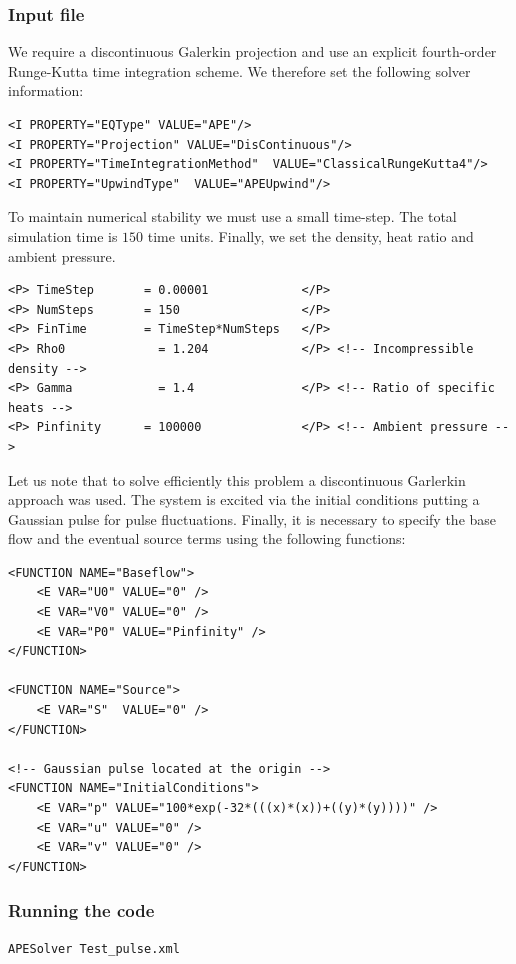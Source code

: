 \subsubsection{Input file}
We require a discontinuous Galerkin projection and use an explicit
fourth-order Runge-Kutta time integration scheme. We therefore set the following
solver information:
\begin{lstlisting}[style=XmlStyle]
<I PROPERTY="EQType" VALUE="APE"/> 
<I PROPERTY="Projection" VALUE="DisContinuous"/>
<I PROPERTY="TimeIntegrationMethod"  VALUE="ClassicalRungeKutta4"/>
<I PROPERTY="UpwindType"  VALUE="APEUpwind"/>
\end{lstlisting}

To maintain numerical stability we must use a small time-step. The total
simulation time is $150$ time units. Finally, we set the density, heat ratio and
ambient pressure.
\begin{lstlisting}[style=XMLStyle]
<P> TimeStep       = 0.00001             </P>
<P> NumSteps       = 150                 </P>
<P> FinTime        = TimeStep*NumSteps   </P>
<P> Rho0             = 1.204             </P> <!-- Incompressible density -->
<P> Gamma            = 1.4               </P> <!-- Ratio of specific heats -->
<P> Pinfinity      = 100000              </P> <!-- Ambient pressure -->
\end{lstlisting}

Let us note that to solve efficiently this problem a discontinuous Garlerkin
approach was used. The
system is excited via the initial conditions putting a Gaussian pulse for pulse
fluctuations.  Finally, it is necessary to specify the base flow and the
eventual source terms using the following functions:

\begin{lstlisting}[style=XmlStyle]
<FUNCTION NAME="Baseflow"> 
    <E VAR="U0" VALUE="0" />
    <E VAR="V0" VALUE="0" />
    <E VAR="P0" VALUE="Pinfinity" />
</FUNCTION>

<FUNCTION NAME="Source"> 
    <E VAR="S"  VALUE="0" />
</FUNCTION>

<!-- Gaussian pulse located at the origin -->
<FUNCTION NAME="InitialConditions">
    <E VAR="p" VALUE="100*exp(-32*(((x)*(x))+((y)*(y))))" />
    <E VAR="u" VALUE="0" />
    <E VAR="v" VALUE="0" />
</FUNCTION>
\end{lstlisting}

\subsubsection{Running the code}
\begin{lstlisting}[style=BashInputStyle]
APESolver Test_pulse.xml
\end{lstlisting}

